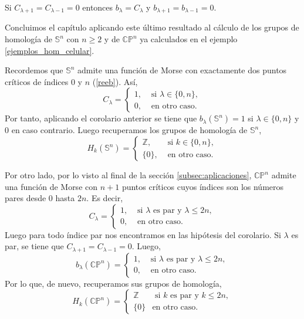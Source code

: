 \begin{corollary}
    Si $C_{\lambda+1} = C_{\lambda-1} = 0$ entonces $b_{\lambda} = C_{\lambda}$ y $b_{\lambda+1} = b_{\lambda-1} = 0$.
\end{corollary}

Concluimos el capítulo aplicando este último resultado al cálculo de los grupos de homología de $\mathbb{S}^n$ con $n\ge 2$ y de $\mathbb{CP}^n$ ya calculados en el ejemplo \ref{ejemplos_hom_celular}.

Recordemos que $\mathbb{S}^n$ admite una función de Morse con exactamente dos puntos críticos de índices $0$ y $n$ (\ref{reeb}). Así,
\begin{equation*}
    C_{\lambda}=
    \begin{cases}
        1, &\text{ si } \lambda \in \{0,n\},\\
        0, &\text{ en otro caso.}
    \end{cases}
\end{equation*}
Por tanto, aplicando el corolario anterior se tiene que $b_{\lambda}(\mathbb{S}^n)=1$ si $\lambda \in \{0,n\}$ y $0$ en caso contrario. Luego recuperamos los grupos de homología de $\mathbb{S}^n$,
\begin{equation*}
    H_{k}(\mathbb{S}^n)=
    \begin{cases}
        \mathbb{Z}, &\text{ si } k \in \{0,n\},\\
        \{0\}, &\text{ en otro caso.}
    \end{cases}
\end{equation*}

Por otro lado, por lo visto al final de la sección \ref{subsec:aplicaciones}, $\mathbb{CP}^n$ admite una función de Morse con $n+1$ puntos críticos cuyos índices son los números pares desde $0$ hasta $2n$. Es decir,
\begin{equation*}
    C_{\lambda}=
    \begin{cases}
        1, &\text{ si } \lambda \text{ es par  y } \lambda\le 2n,\\
        0, &\text{ en otro caso.}
    \end{cases}
\end{equation*}
Luego para todo índice par nos encontramos en las hipótesis del corolario. Si $\lambda$ es par, se tiene que $C_{\lambda+1}=C_{\lambda-1}=0$. Luego, 
\begin{equation*}
    b_{\lambda}(\mathbb{CP}^n)=
    \begin{cases}
        1, &\text{ si } \lambda \text{ es par  y } \lambda\le 2n,\\
        0, &\text{ en otro caso.}
    \end{cases}
\end{equation*}
Por lo que, de nuevo, recuperamos sus grupos de homología,
\begin{equation*}
    H_k(\mathbb{CP}^n) =
    \begin{cases}
        \mathbb{Z} &\text{ si } k \text{ es par  y } k\le 2n,\\
        \{0\} &\text{en otro caso}.
    \end{cases}
\end{equation*}